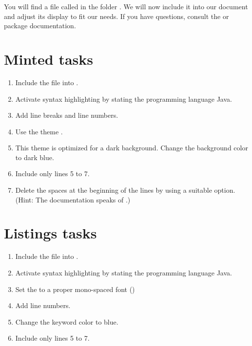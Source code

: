 You will find a file called  in the folder 
.
We will now include it into our document and adjust its display to fit our needs.
If you have questions, consult the  or  package documentation.

\section*{Minted tasks}

\begin{enumerate}
  \item Include the file into 
  .
  \item Activate syntax highlighting by stating the programming language Java.
  \item Add line breaks and line numbers.
  \item Use the theme .
  \item This theme is optimized for a dark background. Change the background color to dark blue.
  \item Include only lines 5 to 7.
  \item Delete the spaces at the beginning of the lines by using a suitable 
  option. (Hint: The documentation speaks of .)
\end{enumerate}

\section*{Listings tasks}

\begin{enumerate}
  \item Include the file into 
  .
  \item Activate syntax highlighting by stating the programming language Java.
  \item Set the  to a proper mono-spaced font ()
  \item Add line numbers.
  \item Change the keyword color to blue.
  \item Include only lines 5 to 7.
\end{enumerate}

\usemintedstyle{} %
